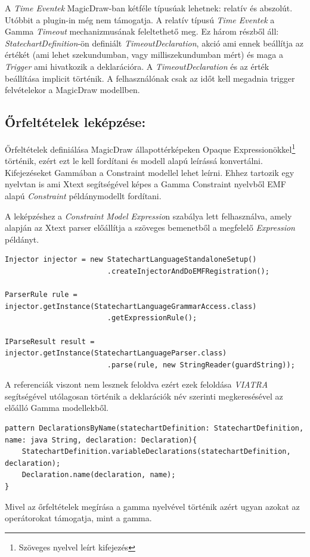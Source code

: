 A \emph{Time Eventek} MagicDraw-ban kétféle típusúak lehetnek: relatív és abszolút. Utóbbit a plugin-in még nem támogatja.
A relatív típusú \emph{Time Eventek} a Gamma \emph{Timeout} mechanizmusának feleltethető meg. Ez három részből áll: \emph{StatechartDefinition}-ön definiált \emph{TimeoutDeclaration}, akció ami ennek beállítja az értékét (ami lehet szekundumban, vagy milliszekundumban mért) és maga a \emph{Trigger} ami hivatkozik a deklarációra. A \emph{TimeoutDeclaration} és az érték beállítása implicit történik. A felhasználónak csak az időt kell megadnia trigger felvételekor a MagicDraw modellben.

\subsection{Őrfeltételek leképzése:}
Őrfeltételek definiálása MagicDraw állapottérképeken Opaque Expressionökkel\footnote{Szöveges nyelvel leírt kifejezés} történik, ezért ezt le kell fordítani és modell alapú leírássá konvertálni. Kifejezéseket Gammában a Constraint modellel lehet leírni. Ehhez tartozik egy nyelvtan is ami Xtext segítségével képes a Gamma Constraint nyelvből EMF alapú \emph{Constraint} példánymodellt fordítani.

A leképzéshez a \emph{Constraint Model Expressio}n szabálya lett felhasználva, amely alapján az Xtext parser előállítja a szöveges bemenetből a megfelelő \emph{Expression} példányt.
\lstset{style=javacode}
\begin{lstlisting}
Injector injector = new StatechartLanguageStandaloneSetup()
						.createInjectorAndDoEMFRegistration();
						
ParserRule rule = injector.getInstance(StatechartLanguageGrammarAccess.class)
						.getExpressionRule();
						
IParseResult result = injector.getInstance(StatechartLanguageParser.class)
						.parse(rule, new StringReader(guardString));
\end{lstlisting}
A referenciák viszont nem lesznek feloldva ezért ezek feloldása \emph{VIATRA} segítségével utólagosan történik a deklarációk név szerinti megkeresésével az előálló Gamma modellekből.
\lstset{style=VQL}
\begin{lstlisting}
pattern DeclarationsByName(statechartDefinition: StatechartDefinition, name: java String, declaration: Declaration){
	StatechartDefinition.variableDeclarations(statechartDefinition, declaration);
	Declaration.name(declaration, name);
}
\end{lstlisting}
 Mivel az őrfeltételek megírása a gamma nyelvével történik azért ugyan azokat az operátorokat támogatja, mint a gamma.

